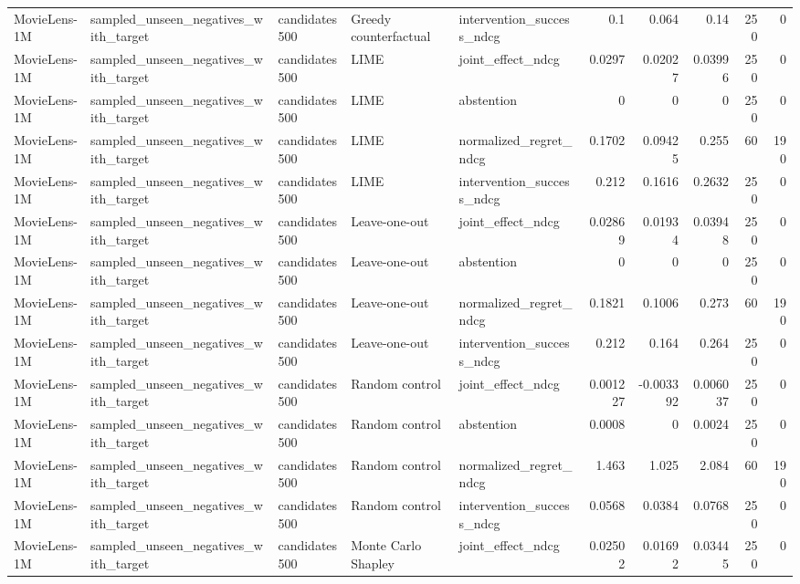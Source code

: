 \begin{table}[t]
{\begin{tabular}{lllllrrrrr}
MovieLens-1M & sampled\_unseen\_negatives\_with\_target & candidates500 & Greedy counterfactual & intervention\_success\_ndcg & 0.1 & 0.064 & 0.14 & 250 & 0 \\
MovieLens-1M & sampled\_unseen\_negatives\_with\_target & candidates500 & LIME & joint\_effect\_ndcg & 0.0297 & 0.02027 & 0.03996 & 250 & 0 \\
MovieLens-1M & sampled\_unseen\_negatives\_with\_target & candidates500 & LIME & abstention & 0 & 0 & 0 & 250 & 0 \\
MovieLens-1M & sampled\_unseen\_negatives\_with\_target & candidates500 & LIME & normalized\_regret\_ndcg & 0.1702 & 0.09425 & 0.255 & 60 & 190 \\
MovieLens-1M & sampled\_unseen\_negatives\_with\_target & candidates500 & LIME & intervention\_success\_ndcg & 0.212 & 0.1616 & 0.2632 & 250 & 0 \\
MovieLens-1M & sampled\_unseen\_negatives\_with\_target & candidates500 & Leave-one-out & joint\_effect\_ndcg & 0.02869 & 0.01934 & 0.03948 & 250 & 0 \\
MovieLens-1M & sampled\_unseen\_negatives\_with\_target & candidates500 & Leave-one-out & abstention & 0 & 0 & 0 & 250 & 0 \\
MovieLens-1M & sampled\_unseen\_negatives\_with\_target & candidates500 & Leave-one-out & normalized\_regret\_ndcg & 0.1821 & 0.1006 & 0.273 & 60 & 190 \\
MovieLens-1M & sampled\_unseen\_negatives\_with\_target & candidates500 & Leave-one-out & intervention\_success\_ndcg & 0.212 & 0.164 & 0.264 & 250 & 0 \\
MovieLens-1M & sampled\_unseen\_negatives\_with\_target & candidates500 & Random control & joint\_effect\_ndcg & 0.001227 & -0.003392 & 0.006037 & 250 & 0 \\
MovieLens-1M & sampled\_unseen\_negatives\_with\_target & candidates500 & Random control & abstention & 0.0008 & 0 & 0.0024 & 250 & 0 \\
MovieLens-1M & sampled\_unseen\_negatives\_with\_target & candidates500 & Random control & normalized\_regret\_ndcg & 1.463 & 1.025 & 2.084 & 60 & 190 \\
MovieLens-1M & sampled\_unseen\_negatives\_with\_target & candidates500 & Random control & intervention\_success\_ndcg & 0.0568 & 0.0384 & 0.0768 & 250 & 0 \\
MovieLens-1M & sampled\_unseen\_negatives\_with\_target & candidates500 & Monte Carlo Shapley & joint\_effect\_ndcg & 0.02502 & 0.01692 & 0.03445 & 250 & 0 \\

\end{tabular}}
\end{table}
